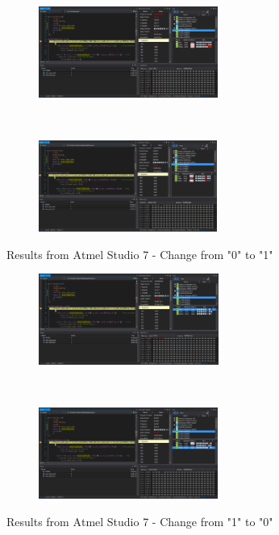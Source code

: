 \documentclass{article}
\begin{document}
	\begin{figure}[h!]
		\centering
		\begin{subfigure}[t]{0.5\textwidth}
			\centering
			\includegraphics[height=3cm, width=\linewidth]{./results/lab9_sim_a_a.png}
		\end{subfigure}%
		~
		\begin{subfigure}[t]{0.5\textwidth}
			\centering
			\includegraphics[height=3cm, width=\linewidth]{./results/lab9_sim_b_a.png}
		\end{subfigure}
		\caption{Results from Αtmel Studio 7 - Change from "0" to "1"}
		
		\begin{subfigure}[t]{0.5\textwidth}
			\centering
			\includegraphics[height=3cm, width=\linewidth]{./results/lab9_sim_c_a.png}
		\end{subfigure}%
		~
		\begin{subfigure}[t]{0.5\textwidth}
			\centering
			\includegraphics[height=3cm, width=\linewidth]{./results/lab9_sim_d_a.png}
		\end{subfigure}
	    \caption{Results from Αtmel Studio 7 - Change from "1" to "0"}
	\end{figure}
\pagebreak
\end{document}
